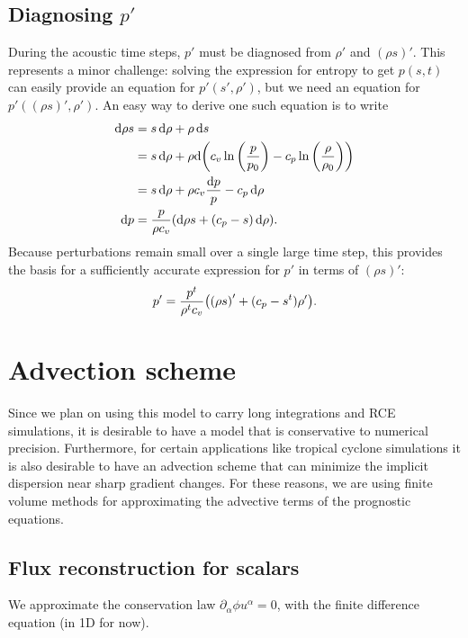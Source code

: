 \documentclass[11pt]{article}
\begin{document}
\subsection{Diagnosing $p'$}

During the acoustic time steps, $p'$ must be diagnosed from $\rho'$ and $(\rho s)'$. This represents a minor challenge: solving the expression for entropy to get $p(s,t)$ can easily provide an equation for $p'(s', \rho')$, but we need an equation for $p'((\rho s)', \rho')$. An easy way to derive one such equation is to write
\begin{align*}
\dd{\rho s} &= s \dd{\rho} + \rho \dd{s} \\
&= s \dd{\rho} + \rho \dd \qty(c_v \ln \qty(\frac{p}{p_0}) - c_p \ln \qty(\frac{\rho}{\rho_0})) \\
&= s \dd{\rho} + \rho c_v \frac{\dd{p}}{p} - c_p \dd{\rho} \\
\dd{p} &= \frac{p}{\rho c_v} \qty(\dd{\rho s} + \qty(c_p - s) \dd{\rho}).
\end{align*}
Because perturbations remain small over a single large time step, this provides the basis for a sufficiently accurate expression for $p'$ in terms of $(\rho s)'$:
\begin{equation}
p' = \frac{p^t}{\rho^t c_v} \qty(\qty(\rho s)' + (c_p - s^t) \rho').
\end{equation}

\section{Advection scheme}

Since we plan on using this model to carry long integrations and RCE simulations, it is desirable to have a model that is conservative to numerical precision. Furthermore, for certain applications like tropical cyclone simulations it is also desirable to have an advection scheme that can minimize the implicit dispersion near sharp gradient changes. For these reasons, we are using finite volume methods for approximating the advective terms of the prognostic equations.

\subsection{Flux reconstruction for scalars}

We approximate the conservation law $\partial_\alpha \phi u^{\alpha} = 0$, with the finite difference equation (in 1D for now).
\end{document}
